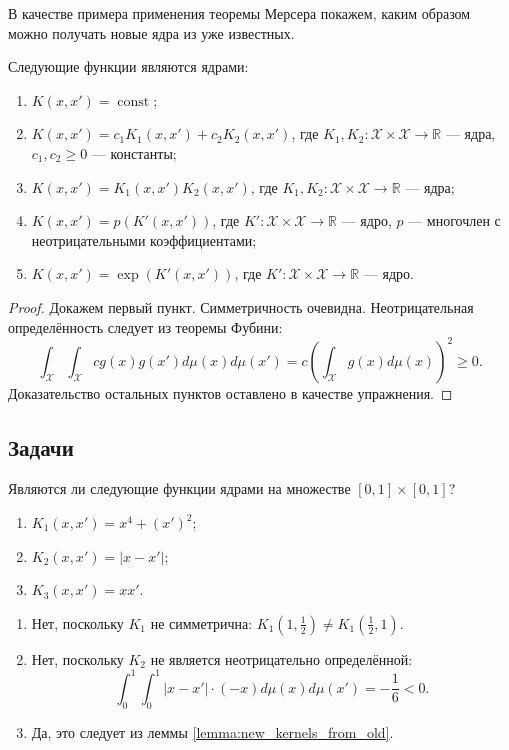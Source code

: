 В качестве примера применения теоремы Мерсера покажем, каким образом можно получать новые ядра из уже известных.

\begin{lemma}
    \label{lemma:new_kernels_from_old}
    Следующие функции являются ядрами:
    \begin{enumerate}
        \item $K(x, x') = \operatorname{const}$;
        \item $K(x, x') = c_1 K_1(x, x') + c_2 K_2(x, x')$, где $K_1, K_2 \colon \mathcal{X} \times \mathcal{X} \to \mathbb{R}$ --- ядра, $c_1, c_2 \ge 0$ --- константы;
        \item $K(x, x') = K_1(x, x') K_2(x, x')$, где $K_1, K_2 \colon \mathcal{X} \times \mathcal{X} \to \mathbb{R}$ --- ядра;
        \item $K(x, x') = p(K'(x, x'))$, где $K' \colon \mathcal{X} \times \mathcal{X} \to \mathbb{R}$ --- ядро, $p$ --- многочлен с неотрицательными коэффициентами;
        \item $K(x, x') = \exp(K'(x, x'))$, где $K' \colon \mathcal{X} \times \mathcal{X} \to \mathbb{R}$ --- ядро.
    \end{enumerate}
\end{lemma}
\begin{proof}
    Докажем первый пункт. Симметричность очевидна. Неотрицательная определённость следует из теоремы Фубини:
    \[ \int_\mathcal{X} \int_\mathcal{X} c g(x) g(x') d\mu(x) d\mu(x') = c \left( \int_\mathcal{X} g(x) d\mu(x) \right)^2 \ge 0. \]
    Доказательство остальных пунктов оставлено в качестве упражнения.
\end{proof}

\subsection{Задачи}

\begin{problem}
Являются ли следующие функции ядрами на множестве $[0,1] \times [0,1]$?
\begin{enumerate}
    \item $K_1(x, x') = x^4 + (x')^2$;
    \item $K_2(x, x') = |x - x'|$;
    \item $K_3(x, x') = x x'$.
\end{enumerate}
\end{problem}
\begin{solution}
    \begin{enumerate}
        \item Нет, поскольку $K_1$ не симметрична: $K_1\left(1, \frac{1}{2}\right) \ne K_1\left(\frac{1}{2}, 1\right)$.
        \item Нет, поскольку $K_2$ не является неотрицательно определённой:
              \[ \int_0^1 \int_0^1 |x - x'| \cdot (-x) d\mu(x) d\mu(x') = -\frac{1}{6} < 0. \]
        \item Да, это следует из леммы \ref{lemma:new_kernels_from_old}.
    \end{enumerate}
\end{solution}

